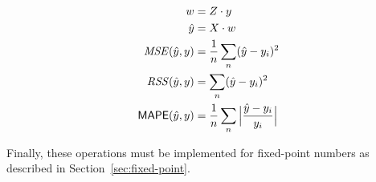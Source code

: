 \begin{align*}
w &= Z \cdot y
\\
\hat{y} &= X \cdot w
\\
\mathit{MSE}(\hat{y}, y) &= \frac{1}{n} \sum_n (\hat{y} - y_i)^2
\\
\mathit{RSS}(\hat{y}, y) &= \sum_n (\hat{y} - y_i)^2
\\
\mathsf{MAPE}(\hat{y}, y) &= \frac{1}{n} \sum_n \Big| \frac{\hat{y} - y_i}{y_i} \Big|
\end{align*}










Finally, these operations must be implemented for fixed-point numbers as described in Section~\ref{sec:fixed-point}.
